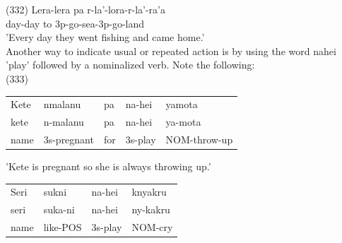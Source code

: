 \documentclass[10pt]{article}
\begin{document}
(332) Lera-lera pa r-la'-lora-r-la'-ra'a\\
day-day to 3p-go-sea-3p-go-land\\
'Every day they went fishing and came home.'\\
Another way to indicate usual or repeated action is by using the word nahei 'play' followed by a nominalized verb. Note the following:\\
(333)

\begin{center}
\begin{tabular}{lllll}
Kete & nmalanu & pa & na-hei & yamota \\
kete & n-malanu & pa & na-hei & ya-mota \\
name & 3s-pregnant & for & 3s-play & NOM-throw-up \\
\end{tabular}
\end{center}

'Kete is pregnant so she is always throwing up.'

\begin{center}
\begin{tabular}{llll}
Seri & sukni & na-hei & knyakru \\
seri & suka-ni & na-hei & ny-kakru \\
name & like-POS & 3s-play & NOM-cry \\
\end{tabular}
\end{center}
\end{document}
